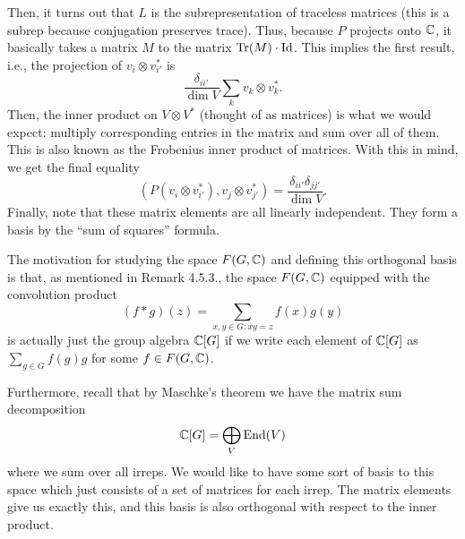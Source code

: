 \documentclass[oneside]{scrbook}
\newcommand{\Id}{\text{Id}}
\begin{document}
Then, it turns out that $L$ is the subrepresentation of traceless matrices (this is a subrep because conjugation preserves trace). Thus, because $P$ projects onto $\mathbb C$, it basically takes a matrix $M$ to the matrix $\Tr(M)\cdot\Id$. This implies the first result, i.e., the projection of $v_i\otimes v_{i'}^*$ is
\[\frac{\delta_{ii'}}{\dim V}\sum_k v_k\otimes v_k^*.\]
Then, the inner product on $V\otimes V^*$ (thought of as matrices) is what we would expect: multiply corresponding entries in the matrix and sum over all of them. This is also known as the Frobenius inner product of matrices. With this in mind, we get the final equality
\[(P(v_i\otimes v_{i'}^*), v_j\otimes v_{j'}^*)=\frac{\delta_{ii'}\delta_{jj'}}{\dim V}.\]
Finally, note that these matrix elements are all linearly independent. They form a basis by the ``sum of squares'' formula. 

\begin{remark}
The motivation for studying the space $F(G,\mathbb C)$ and defining this orthogonal basis is that, as mentioned in Remark 4.5.3., the space $F(G,\mathbb C)$ equipped with the convolution product
\[(f*g)(z)=\sum_{x,y\in G:xy=z}f(x)g(y)\]
is actually just the group algebra $\mathbb C[G]$ if we write each element of $\mathbb C[G]$ as $\sum_{g\in G}f(g)g$ for some $f\in F(G,\mathbb C)$. 

Furthermore, recall that by Maschke's theorem we have the matrix sum decomposition
\[\mathbb C[G]=\bigoplus_{V}\operatorname{End}(V)\]
where we sum over all irreps. We would like to have some sort of basis to this space which just consists of a set of matrices for each irrep. The matrix elements give us exactly this, and this basis is also orthogonal with respect to the inner product.
\end{remark}
\end{document}

